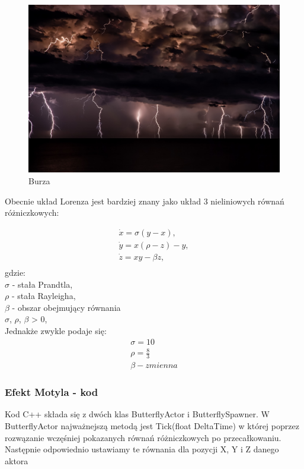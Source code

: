 \documentclass[a4paper,12pt,reqno]{article}
\begin{document}
\begin{figure}[H]%
\centering
\includegraphics[width=0.7\columnwidth]{graphics/butterfly/josep_castells_burza.jpg}
\caption{Burza 
\label{BPExample}}%
%
\qquad
\end{figure} 

Obecnie układ Lorenza jest bardziej znany jako układ 3 nieliniowych
równań różniczkowych\cite{lorenz_dziwne_atraktory}:

\begin{equation}
\begin{split}
\dot{x}=\sigma(y-x),\\
\dot{y}=x(\rho-z)-y,\\
\dot{z}=xy-\beta z,\\
\end{split}
\end{equation}
gdzie:\\
$\sigma$ - stała Prandtla,\\
$\rho$ - stała Rayleigha,\\
$\beta$ - obszar obejmujący równania\\
$\sigma$, $\rho$, $\beta$ > 0,\\
Jednakże zwykle podaje się\cite{lorenz_dziwne_atraktory}:\\
\begin{equation}
\begin{split}
\sigma = 10\\
\rho = \frac{8}{3}\\
\beta - zmienna
\end{split}
\label{ButterflyVariables}
\end{equation}

\subsubsection{Efekt Motyla - kod}

Kod C++ składa się z dwóch klas ButterflyActor i ButterflySpawner.
W ButterflyActor najważnejszą metodą jest Tick(float DeltaTime) w której poprzez rozwązanie wczęśniej pokazanych równań różniczkowych po przecałkowaniu. Następnie odpowiednio ustawiamy te równania dla pozycji X, Y i Z danego aktora \cite{motyle_cpp}
\end{document}

